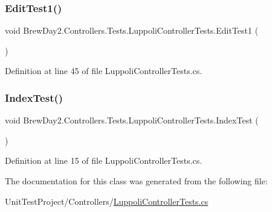 \subsubsection{\texorpdfstring{Edit\+Test1()}{EditTest1()}}
{\footnotesize\ttfamily void Brew\+Day2.\+Controllers.\+Tests.\+Luppoli\+Controller\+Tests.\+Edit\+Test1 (\begin{DoxyParamCaption}{ }\end{DoxyParamCaption})}



Definition at line 45 of file Luppoli\+Controller\+Tests.\+cs.

\mbox{\label{class_brew_day2_1_1_controllers_1_1_tests_1_1_luppoli_controller_tests_a09ddb48c33a104a1954783a88f8152e8}} 
\subsubsection{\texorpdfstring{Index\+Test()}{IndexTest()}}
{\footnotesize\ttfamily void Brew\+Day2.\+Controllers.\+Tests.\+Luppoli\+Controller\+Tests.\+Index\+Test (\begin{DoxyParamCaption}{ }\end{DoxyParamCaption})}



Definition at line 15 of file Luppoli\+Controller\+Tests.\+cs.



The documentation for this class was generated from the following file\+:\begin{DoxyCompactItemize}
\item 
Unit\+Test\+Project/\+Controllers/\mbox{\hyperlink{_luppoli_controller_tests_8cs}{Luppoli\+Controller\+Tests.\+cs}}\end{DoxyCompactItemize}
